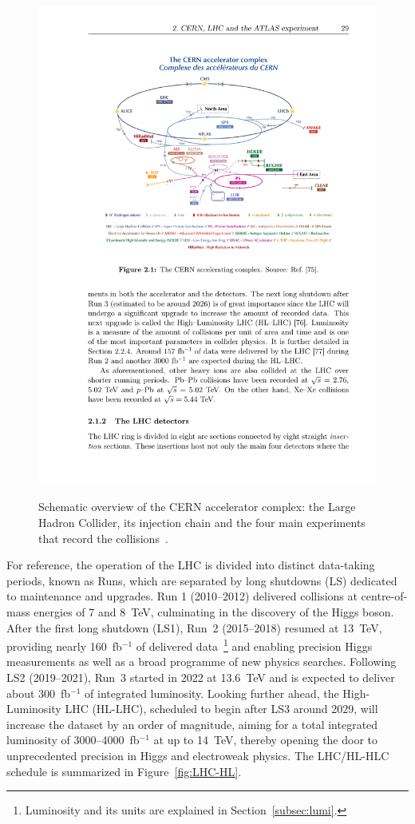\begin{figure}[htbp]
    \centering
    \includegraphics[width=1\linewidth]{images/CCC-v2022}\\
    \caption{Schematic overview of the CERN accelerator complex: the Large Hadron Collider, its injection chain and the four main experiments that record the collisions~\cite{Lopienska:2800984}.}
    \label{LHC:chain}
\end{figure}

For reference, the operation of the LHC is divided into distinct data-taking periods, known as Runs, which are separated by long shutdowns (LS) dedicated to maintenance and upgrades. Run 1 (2010--2012) delivered collisions at centre-of-mass energies of 7 and 8~TeV, culminating in the discovery of the Higgs boson. After the first long shutdown (LS1), Run~2 (2015--2018) resumed at 13~TeV, providing nearly 160~fb$^{-1}$ of delivered data~\footnote{Luminosity and its units are explained in Section~\ref{subsec:lumi}.} and enabling precision Higgs measurements as well as a broad programme of new physics searches. Following LS2 (2019--2021), Run~3 started in 2022 at 13.6~TeV and is expected to deliver about 300~fb$^{-1}$ of integrated luminosity. Looking further ahead, the High-Luminosity LHC (HL-LHC), scheduled to begin after LS3 around 2029, will increase the dataset by an order of magnitude, aiming for a total integrated luminosity of 3000--4000~fb$^{-1}$ at up to 14~TeV, thereby opening the door to unprecedented precision in Higgs and electroweak physics. The LHC/HL-HLC schedule is summarized in Figure~\ref{fig:LHC-HL}.

